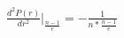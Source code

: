 \documentclass[preview]{standalone}
\begin{document}
\begin{align*}
\frac{d^{2}P(r)}{dr^{2}}|_{\frac{n-1}{e}}=-\frac{1}{n*\frac{n-1}{e}}
\end{align*}
\end{document}
